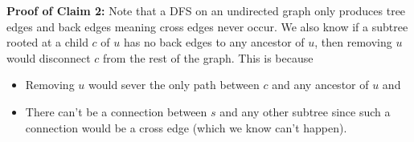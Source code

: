 \documentclass[11pt, letterpaper, titlepage]{article}
\begin{document}
\begin{enumerate}[label=\alph*.]
    \textbf{Proof of Claim 2:} Note that a DFS on an undirected graph only produces tree edges and back edges meaning cross edges never occur. We also know if a subtree rooted at a child $c$ of $u$ has no back edges to any ancestor of $u$, then removing $u$ would disconnect $c$ from the rest of the graph. This is because
    \begin{itemize}
        \item Removing $u$ would sever the only path between $c$ and any ancestor of $u$ and
        \item There can't be a connection between $s$ and any other subtree since such a connection would be a cross edge (which we know can't happen).
    \end{itemize}
\end{enumerate}
\end{document}
